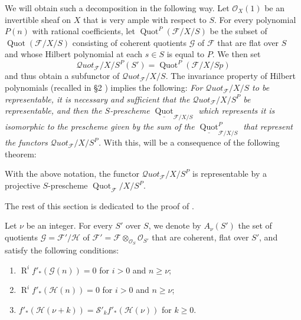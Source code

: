 We will obtain such a decomposition in the following way.
Let $\mathcal{O}_X(1)$ be an invertible sheaf on $X$ that is very ample with respect to $S$.
For every polynomial $P(n)$ with rational coefficients, let $\operatorname{Quot}^P(\mathcal{F}/X/S)$ be the subset of $\operatorname{Quot}(\mathcal{F}/X/S)$ consisting of coherent quotients $\mathcal{G}$ of $\mathcal{F}$ that are flat over $S$ and whose Hilbert polynomial at each $s\in S$ is equal to $P$.
We then set
\[
  \mathcal{Q}uot_\mathcal{F}/X/S^P(S')
  = \operatorname{Quot}^P(\mathcal{F}/X/Sp)
\]
and thus obtain a subfunctor of $\mathcal{Q}uot_\mathcal{F}/X/S$.
The invariance property of Hilbert polynomials (recalled in §2 ) implies the following:
\emph{For $\mathcal{Q}uot_\mathcal{F}/X/S$ to be representable, it is necessary and sufficient that the $\mathcal{Q}uot_\mathcal{F}/X/S^P$ be representable, and then the $S$-prescheme $\underline{\operatorname{Quot}}_{\mathcal{F}/X/S}$ which represents it is isomorphic to the prescheme given by the sum of the $\underline{\operatorname{Quot}}_{\mathcal{F}/X/S}^P$ that represent the functors $\mathcal{Q}uot_\mathcal{F}/X/S^P$.}
With this,  will be a consequence of the following theorem:


\begin{theorem}\label{fga3.iv-3-theorem-3.2}
  With the above notation, the functor $\mathcal{Q}uot_\mathcal{F}/X/S^P$ is representable by a projective $S$-prescheme $\operatorname{Quot}_\mathcal{F}/X/S^P$.
\end{theorem}


The rest of this section is dedicated to the proof of .

Let $\nu$ be an integer.
For every $S'$ over $S$, we denote by $A_\nu(S')$ the set of quotients $\mathcal{G}=\mathcal{F}'/\mathcal{H}$ of $\mathcal{F}'=\mathcal{F}\otimes_{\mathcal{O}_S}\mathcal{O}_{S'}$ that are coherent, flat over $S'$, and satisfy the following conditions:

\begin{enumerate}[label=\alph*.]
  \item $\operatorname{R}^i f'_*(\mathcal{G} (n))=0$ for $i>0$ and $n\geqslant\nu$;
  \item $\operatorname{R}^i f'_*(\mathcal{H} (n))=0$ for $i>0$ and $n\geqslant\nu$;
  \item $f'_*(\mathcal{H} (\nu+k))=\mathcal{S}'_k f'_*(\mathcal{H} (\nu))$ for $k\geqslant0$.
\end{enumerate}

